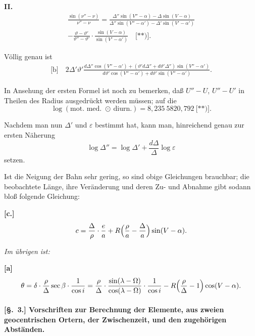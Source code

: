 \documentclass[12pt,a4paper]{article}
\theoremstyle{plain}
\theoremstyle{definition}
\theoremstyle{remark}
\begin{document}
\medskip

\textbf{II.}
\begin{multline*}
\frac{\sin(\nu'' - \nu)}{\nu'' - \nu} = \frac{\Delta'' \sin(V'' - \alpha) - \Delta \sin(V - \alpha)}{\Delta'' \sin(V'' - \alpha') - \Delta' \sin(V' - \alpha')} \\
- \frac{\vartheta - \vartheta'}{\vartheta'' - \vartheta'} \cdot \frac{\sin(V - \alpha)}{\sin(V' - \alpha')} \quad \text{[**)]}.
\end{multline*}

Völlig genau ist
\begin{multline*}
\text{[b]}\quad 2\Delta' \vartheta' \frac{d\Delta'' \cos(V'' - \alpha') + (\vartheta' d\Delta'' + d\vartheta' \Delta'') \sin(V'' - \alpha')}{d\vartheta' \cos(V'' - \alpha') + d\vartheta' \sin(V'' - \alpha')}.
\end{multline*}

In Ansehung der ersten Formel ist noch zu bemerken, daß $U'' - U$, $U'' - U'$ in Theilen des Radius ausgedrückt werden müssen; auf die
\[
\log(\text{mot. med. } \odot\ \text{diurn.}) = 8{,}235\ 5820{,}792\ \text{[**)]}.
\]

\medskip

Nachdem man nun $\Delta'$ und $\varepsilon$ bestimmt hat, kann man, hinreichend genau zur ersten Näherung
\[
\log \Delta'' = \log \Delta' + \frac{d\Delta}{\Delta} \log \varepsilon
\]
setzen.

\newpage

Ist die Neigung der Bahn sehr gering, so sind obige Gleichungen brauchbar; die beobachtete Länge, ihre Veränderung und deren Zu- und Abnahme gibt sodann bloß folgende Gleichung:

\textbf{[c.]}
\[
c = \frac{\Delta}{\rho} \cdot \frac{e}{a} + R\Bigl(\frac{\rho}{a} - \frac{\Delta}{a}\Bigr) \sin(V - \alpha).
\]

\textit{Im übrigen ist:}

\textbf{[a]}
\[
\theta = \delta \cdot \frac{\rho}{\Delta} \sec\beta \cdot \frac{1}{\cos i} = \frac{\rho}{\Delta} \cdot \frac{\sin(\lambda - \Omega)}{\cos(\lambda - \Omega)} \cdot \frac{1}{\cos i} - R\Bigl(\frac{\rho}{\Delta} - 1\Bigr) \cos(V - \alpha).
\]

\newpage

\paragraph{[§.~3.] Vorschriften zur Berechnung der Elemente, aus zweien geocentrischen Ortern, der Zwischenzeit, und den zugehörigen Abständen.}
\end{document}
